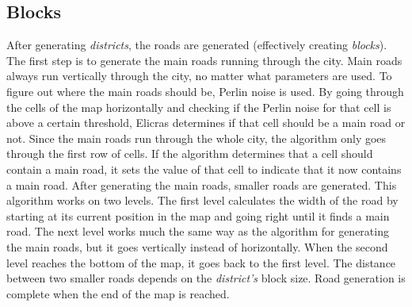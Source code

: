 	\subsection{Blocks}
	After generating \textit{districts}, the roads are generated (effectively creating \textit{blocks}). The first step is to generate the main roads running through the city. Main roads always run vertically through the city, no matter what parameters are used. To figure out where the main roads should be, Perlin noise is used. By going through the cells of the map horizontally and checking if the Perlin noise for that cell is above a certain threshold, Elicras determines if that cell should be a main road or not. Since the main roads run through the whole city, the algorithm only goes through the first row of cells. If the algorithm determines that a cell should contain a main road, it sets the value of that cell to indicate that it now contains a main road. After generating the main roads, smaller roads are generated. This algorithm works on two levels. The first level calculates the width of the road by starting at its current position in the map and going right until it finds a main road. The next level works much the same way as the algorithm for generating the main roads, but it goes vertically instead of horizontally. When the second level reaches the bottom of the map, it goes back to the first level. The distance between two smaller roads depends on the \textit{district's} block size. Road generation is complete when the end of the map is reached.
		
